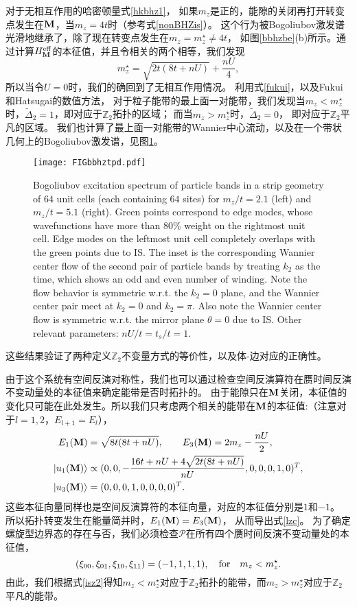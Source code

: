 对于无相互作用的哈密顿量式\eqref{hkbhz1}，
如果$m_z$是正的，能隙的关闭再打开转变点发生在$\vb M$，当$m_z=4t$时（参考式\eqref{nonBHZis}）。
这个行为被Bogoliubov激发谱光滑地继承了，除了现在转变点发生在$m_z=m_z^\star\neq4t$，
如图\ref{bbhzbe}(b)所示。通过计算$H_{\vb M}^{\text{eff}}$的本征值，并且令相关的两个相等，我们发现
\begin{equation}\label{lzc}
	m_z^\star= \sqrt{2t(8t+nU)}+\frac{nU}{4},
\end{equation}
所以当令$U=0$时，我们的确回到了无相互作用情况。
利用式\eqref{fukui}，以及Fukui和Hatsugai的数值方法\cite{Fukui2007}，
对于粒子能带的最上面一对能带，我们发现当$m_z<m_z^\star$时，$\tilde \Delta_2=1$，即对应于$\mathbb Z_2$拓扑的区域；
而当$m_z>m_z^\star$时，$\tilde \Delta_2=0$，
即对应于$\mathbb Z_2$平凡的区域。
我们也计算了最上面一对能带的Wannier中心流动，以及在一个带状几何上的Bogoliubov激发谱，见图\ref{bbhztpd}。%
\begin{figure}
	\texttt{[image: FIGbbhztpd.pdf]}
	\caption{\label{bbhztpd} Bogoliubov excitation spectrum of particle bands in a strip geometry of $64$ unit cells (each containing $64$ sites) for $m_z/t=2.1$ (left) and $m_z/t=5.1$ (right). Green points correspond to edge modes, whose wavefunctions have more than $80\%$ weight on the rightmost unit cell. Edge modes on the leftmost unit cell completely overlaps with the green points due to IS. The inset is the corresponding Wannier center flow of the second pair of particle bands by treating $k_2$ as the time, which shows an odd and even number of winding. Note the flow behavior is symmetric w.r.t. the $k_2=0$ plane, and the Wannier center pair meet at $k_2=0$ and $k_2=\pi$. Also note the Wannier center flow is symmetric w.r.t. the mirror plane $\theta=0$ due to IS. Other relevant parameters: $nU/t=t_s/t=1$.}
\end{figure}
这些结果验证了两种定义$\mathbb Z_2$不变量方式的等价性，以及体-边对应的正确性。

由于这个系统有空间反演对称性，我们也可以通过检查空间反演算符在赝时间反演不变动量处的本征值来确定能带是否时拓扑的。
由于能隙只在$\vb M$关闭，本征值的变化只可能在此处发生。所以我们只考虑两个相关的能带在$\vb M$的本征值:（注意对于$l=1,2$，$E_{l+1}=E_l$），
\begin{equation*}
	\begin{split}
		E_1(\vb M) &=\sqrt{8t(8t+nU)},\qquad E_3(\vb M)=2m_z-\frac{nU}{2}, \\
		\ket{u_1(\vb M)} &\propto (0,0,-\frac{16t + nU +4\sqrt{2t(8t+nU)}}{nU},0,0,0,1,0)^T, \\ \ket{u_3(\vb M)} &= (0,0,0,1,0,0,0,0)^T.
	\end{split}
\end{equation*}
这些本征向量同样也是空间反演算符的本征向量，对应的本征值分别是$1$和$-1$。
所以拓扑转变发生在能量简并时，$E_1(\vb M)=E_3(\vb M)$，
从而导出式\eqref{lzc}。
为了确定螺旋型边界态的存在与否，我们必须检查$\mathcal P$在所有四个赝时间反演不变动量处的本征值，
\begin{equation*}
	(\xi_{00},\xi_{01},\xi_{10},\xi_{11})=(-1,1,1,1),\qfor m_z<m_z^\star.
\end{equation*}
由此，我们根据式\eqref{isz2}得知$m_z<m_z^\star$对应于$\mathbb Z_2$拓扑的能带，而$m_z>m_z^\star$对应于$\mathbb Z_2$平凡的能带。


